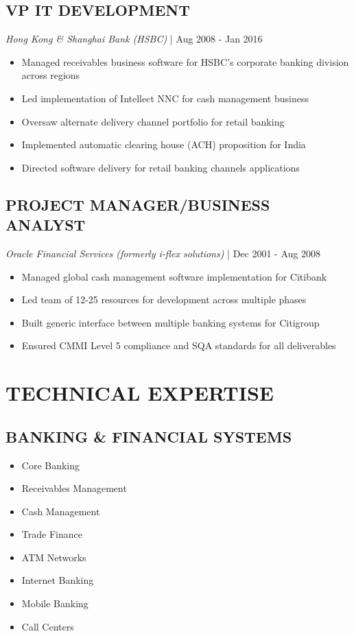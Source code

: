 \documentclass[a4paper,11pt]{article}
\newcommand{\workperiod}[2]{{\small \textit{#1} | #2}}
\newcommand{\skillitem}[1]{\item[\textbullet] #1}
\begin{document}
\subsection{VP IT DEVELOPMENT}
\workperiod{Hong Kong \& Shanghai Bank (HSBC)}{Aug 2008 - Jan 2016}

\begin{itemize}[leftmargin=*]
    \item Managed receivables business software for HSBC's corporate banking division across regions
    \item Led implementation of Intellect NNC for cash management business
    \item Oversaw alternate delivery channel portfolio for retail banking
    \item Implemented automatic clearing house (ACH) proposition for India
    \item Directed software delivery for retail banking channels applications
\end{itemize}

\subsection{PROJECT MANAGER/BUSINESS ANALYST}
\workperiod{Oracle Financial Services (formerly i-flex solutions)}{Dec 2001 - Aug 2008}

\begin{itemize}[leftmargin=*]
    \item Managed global cash management software implementation for Citibank
    \item Led team of 12-25 resources for development across multiple phases
    \item Built generic interface between multiple banking systems for Citigroup
    \item Ensured CMMI Level 5 compliance and SQA standards for all deliverables
\end{itemize}

\section{TECHNICAL EXPERTISE}

\subsection{BANKING \& FINANCIAL SYSTEMS}
\begin{multicols}{2}
\begin{itemize}[leftmargin=*]
    \skillitem{Core Banking}
    \skillitem{Receivables Management}
    \skillitem{Cash Management}
    \skillitem{Trade Finance}
    \skillitem{ATM Networks}
    \skillitem{Internet Banking}
    \skillitem{Mobile Banking}
    \skillitem{Call Centers}
\end{itemize}
\end{multicols}
\end{document}
